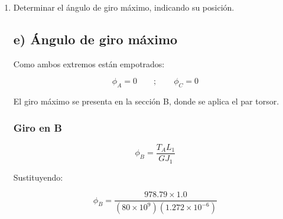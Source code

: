 \documentclass[12pt,a4paper]{article}
\begin{document}
\begin{enumerate}
\begin{equation}
|T_{AB}|=978.79\ \text{N$\cdot$m}
\end{equation}

\begin{equation}
|T_{BC}|=221.21\ \text{N$\cdot$m}
\end{equation}

Por tanto, el momento torsor máximo es:

\begin{equation}
\boxed{|T|_{\max}=978.79\ \text{N$\cdot$m}}
\end{equation}

y se presenta en el tramo A--B:

\begin{equation}
\boxed{0 \leq x < 1.0\ \text{m}}
\end{equation}

\subsubsection*{Interpretación}

El tramo A--B constituye la región crítica desde el punto de vista torsional, ya que concentra la mayor reacción hiperestática y, en consecuencia, el mayor torsor interno.

\item[e)] Determinar el ángulo de giro máximo, indicando su posición.

\subsection*{e) Ángulo de giro máximo}

Como ambos extremos están empotrados:

\begin{equation}
\phi_A=0
\qquad ; \qquad
\phi_C=0
\end{equation}

El giro máximo se presenta en la sección B, donde se aplica el par torsor.

\subsubsection*{Giro en B}

\begin{equation}
\phi_B=\frac{T_A L_1}{GJ_1}
\end{equation}

Sustituyendo:

\begin{equation}
\phi_B=\frac{978.79\times1.0}{(80\times10^9)(1.272\times10^{-6})}
\end{equation}


\end{enumerate}
\end{document}
